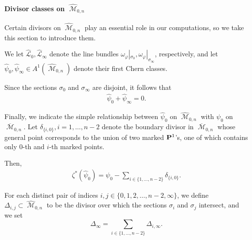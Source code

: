 \documentclass[12pt,reqno]{amsart}
\DeclareMathOperator{\M}{\mathcal{M}}
\numberwithin{equation}{section}
\newcommand{\hL}{\widehat{\mathcal{L}}}
\newcommand{\hpsi}{\widehat{\psi}}
\newcommand{\hM}{\widehat{\M}}
\renewcommand {\o}[1]{\overline{#1}}
\begin{document}
\paragraph{Divisor classes on $\hM_{0,n}$}
\label{sec:divisor-classes-hm_0}

Certain divisors on $\hM_{0,n}$  play an essential role in our
computations, so we take this section to introduce them.

\begin{definition}
  \label{def:psihats} We let $\hL_{0}, \hL_{\infty}$ denote the line
  bundles
  $\omega_{\varphi}|_{\sigma_{0}},
  \omega_{\varphi}|_{\sigma_{\infty}}$, respectively, and let
  $\hpsi_{0}, \hpsi_{\infty} \in A^{1}(\hM_{0,n})$ denote their first
  Chern classes.
\end{definition}

Since the sections $\sigma_{0}$ and $\sigma_{\infty}$ are disjoint, it
follows that
\begin{align}
  \label{eq:opposites}
  \hpsi_{0} + \hpsi_{\infty} = 0.
\end{align}


Finally, we indicate the simple relationship between $\hpsi_{0}$ on
$\hM_{0,n}$ with $\psi_{0}$ on $\o{\M}_{0,n}$.  Let
$\delta_{\{i,0\}}, i=1, \dots, n-2$ denote the boundary divisor in
$\o{\M}_{0,n}$ whose general point corresponds to the union of two
marked $\P^{1}$'s, one of which contains only $0$-th and $i$-th marked
points.



Then,
\begin{align}
  \label{eq:relationpsis}
\zeta^{*}(\hpsi_{0}) = \psi_{0} - \sum_{i \in \{1, \dots, n-2\}} \delta_{\{i,0\}}.  
\end{align}













\begin{definition}
  \label{def:boundary}
  For each distinct pair of indices
  $i,j \in \{0, 1, 2, \dots, n-2, \infty \}$, we define
  $\Delta_{i,j} \subset \hM_{0,n}$ to be the divisor over which the
  sections $\sigma_{i}$ and $\sigma_{j}$ intersect, and we set
  $$\Delta_{\infty} = \sum_{i \in \{1, \dots, n-2 \}}
  \Delta_{i,\infty}.$$
\end{definition}
\end{document}
